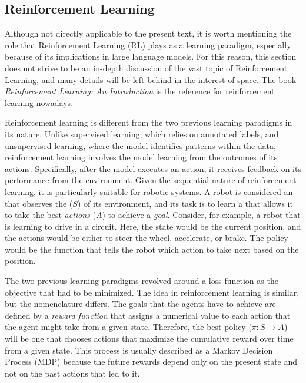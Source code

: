 \subsection{Reinforcement Learning}
Although not directly applicable to the present text, it is worth mentioning the role that Reinforcement Learning (RL) plays as a learning paradigm, especially because of its implications in large language models. For this reason, this section does not strive to be an in-depth discussion of the vast topic of Reinforcement Learning, and many details will be left behind in the interest of space. The book \textit{Reinforcement Learning: An Introduction} is the reference for reinforcement learning nowadays.

Reinforcement learning is different from the two previous learning paradigms in its nature. Unlike supervised learning, which relies on annotated labels, and unsupervised learning, where the model identifies patterns within the data, reinforcement learning involves the model learning from the outcomes of its actions. Specifically, after the model executes an action, it receives feedback on its performance from the environment. Given the sequential nature of reinforcement learning, it is particularly suitable for robotic systems. A robot is considered an \textit{} that observes the \textit{} ($S$) of its environment, and its task is to learn a \textit{} that allows it to take the best \textit{actions} ($A$) to achieve a \textit{goal}. Consider, for example, a robot that is learning to drive in a circuit. Here, the state would be the current position, and the actions would be either to steer the wheel, accelerate, or brake. The policy would be the function that tells the robot which action to take next based on the position.

The two previous learning paradigms revolved around a loss function as the objective that had to be minimized. The idea in reinforcement learning is similar, but the nomenclature differs. The goals that the agents have to achieve are defined by a \textit{reward function} that assigns a numerical value to each action that the agent might take from a given state. Therefore, the best policy ($\pi: S \rightarrow A$) will be one that chooses actions that maximize the cumulative reward over time from a given state. This process is usually described as a Markov Decision Process (MDP) because the future rewards depend only on the present state and not on the past actions that led to it.


